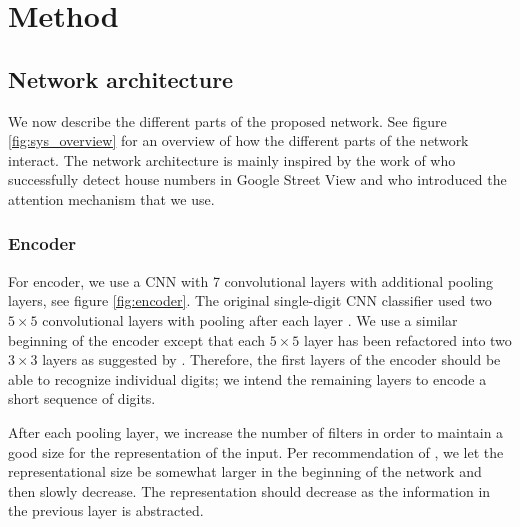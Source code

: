\chapter{Method}

\section{Network architecture}



We now describe the different parts of the proposed network. See figure \ref{fig:sys_overview} for an overview of how the different parts of the network interact.
The network architecture is mainly inspired by the work of \textcite{multidigit_streetview} who successfully detect house numbers in Google Street View and \textcite{AttendAndTell} who introduced the attention mechanism that we use.

\subsection{Encoder}



For encoder, we use a CNN with 7 convolutional layers with additional pooling layers, see figure \ref{fig:encoder}.
The original single-digit CNN classifier used two $5 \times 5$ convolutional layers with pooling after each layer \cite{lecun_1989}.
We use a similar beginning of the encoder except that each $5 \times 5$ layer has been refactored into two $3 \times 3$ layers as suggested by \textcite{InceptionV3}. Therefore, the first layers of the encoder should be able to recognize individual digits; we intend the remaining layers to encode a short sequence of digits.


After each pooling layer, we increase the number of filters in order to maintain a good size for the representation of the input. Per recommendation of \textcite{InceptionV3}, we let the representational size be somewhat larger in the beginning of the network and then slowly decrease. The representation should decrease as the information in the previous layer is abstracted.

